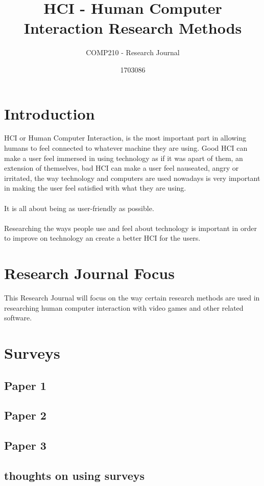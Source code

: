 \documentclass{scrartcl}
\title{HCI - Human Computer Interaction Research Methods}
\subtitle{COMP210 - Research Journal}
\author{1703086}
\begin{document}
\maketitle


\section{Introduction}
HCI or Human Computer Interaction, is the most important part in allowing humans to feel connected to whatever machine they are using. Good HCI can make a user feel immersed in using technology as if it was apart of them, an extension of themselves, bad HCI can make a user feel nauseated, angry or irritated, the way technology and computers are used nowadays is very important in making the user feel satisfied with what they are using.
\\
\\
It is all about being as user-friendly as possible.
\\
\\
Researching the ways people use and feel about technology is important in order to improve on technology an create a better HCI for the users.

\section{Research Journal Focus}
This Research Journal will focus on the way certain research methods are used in researching human computer interaction with video games and other related software.

\section{Surveys}

\subsection{Paper 1}


\subsection{Paper 2}

\subsection{Paper 3}

\subsection{thoughts on using surveys}
\end{document}
